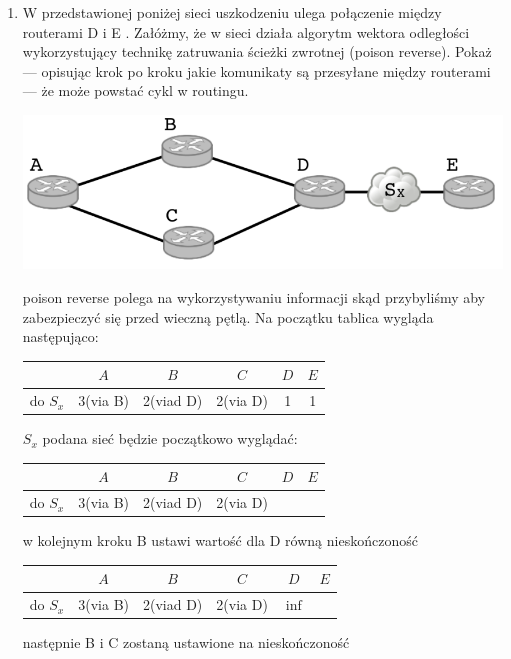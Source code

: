 \documentclass{article}[A4]
\begin{document}
\begin{enumerate}
\item{W przedstawionej poniżej sieci uszkodzeniu ulega połączenie między routerami D i E . Załóżmy, że w sieci działa algorytm wektora odległości wykorzystujący technikę zatruwania ścieżki zwrotnej (poison reverse). Pokaż — opisując krok po kroku jakie komunikaty są przesyłane między routerami
— że może powstać cykl w routingu.}
\begin{center}
	\includegraphics[scale=0.2]{./L01Z08.png}
\end{center}
poison reverse polega na wykorzystywaniu informacji skąd przybyliśmy aby zabezpieczyć się przed wieczną pętlą. Na początku tablica wygląda następująco:
\begin{center}
\begin{tabular}{c||c|c|c|c|c|} 
	  &$A$&$B$&$C$&$D$&$E$\\
	 \hline \hline
	 do $S_x$&3(via B)&2(viad D)&2(via D)&1&1\\ 
	 \hline \hline
\end{tabular}
\end{center} $S_x$ podana sieć będzie początkowo wyglądać:
\begin{center}
\begin{tabular}{c||c|c|c|c|c|} 
	  &$A$&$B$&$C$&$D$&$E$\\
	 \hline \hline
	 do $S_x$&3(via B)&2(viad D)&2(via D)&&\\ 
	 \hline \hline
\end{tabular}
\end{center} 
w kolejnym kroku B ustawi wartość dla D równą nieskończoność
\begin{center}
\begin{tabular}{c||c|c|c|c|c|} 
	  &$A$&$B$&$C$&$D$&$E$\\
	 \hline \hline
	 do $S_x$&3(via B)&2(viad D)&2(via D)&$\inf$&\\ 
	 \hline \hline
\end{tabular}
\end{center}
następnie B i C zostaną ustawione na nieskończoność
\begin{center}
\begin{tabular}{c||c|c|c|c|c|} 

\end{tabular}
\end{center}
\end{enumerate}
\end{document}
